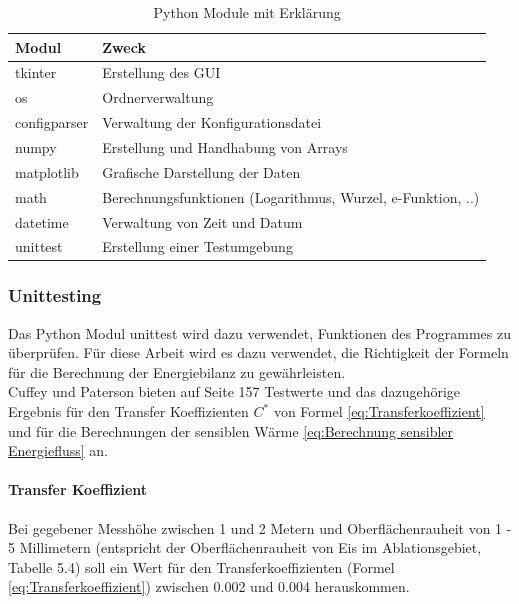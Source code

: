 \documentclass[12pt,a4paper]{article}
\begin{document}
\begin{table}[H]
\centering
{} 
\caption{Python Module mit Erklärung}
\label{tab:Python Module}
\begin{tabular}{|l|l|}
\hline
\textbf{Modul} & \textbf{Zweck}                                \\ \hline
tkinter             & Erstellung des GUI         \\
os             & Ordnerverwaltung         \\
configparser             & Verwaltung der Konfigurationsdatei         \\
numpy          & Erstellung und Handhabung von Arrays          \\
matplotlib     & Grafische Darstellung der Daten               \\
math		   & Berechnungsfunktionen (Logarithmus, Wurzel, e-Funktion, ..)   \\  
datetime		   & Verwaltung von Zeit und Datum   \\
unittest		   & Erstellung einer Testumgebung   \\  \hline


\end{tabular}
\end{table}
\vspace{0.3cm}

\subsubsection{Unittesting}
Das Python Modul unittest wird dazu verwendet, Funktionen des Programmes zu überprüfen. Für diese Arbeit wird es dazu verwendet, die Richtigkeit der Formeln für die Berechnung der Energiebilanz zu gewährleisten.\\

Cuffey und Paterson bieten auf Seite 157 Testwerte und das dazugehörige Ergebnis für den Transfer Koeffizienten $C^*$ von Formel \ref{eq:Transferkoeffizient} und für die Berechnungen der sensiblen Wärme \ref{eq:Berechnung sensibler Energiefluss} an.


\paragraph{Transfer Koeffizient}

Bei gegebener Messhöhe zwischen 1 und 2 Metern und Oberflächenrauheit von  1 - 5 Millimetern (entspricht der Oberflächenrauheit von Eis im Ablationsgebiet, Tabelle 5.4) soll ein Wert für den Transferkoeffizienten (Formel \ref{eq:Transferkoeffizient}) zwischen 0.002 und 0.004 herauskommen.\\
\end{document}

